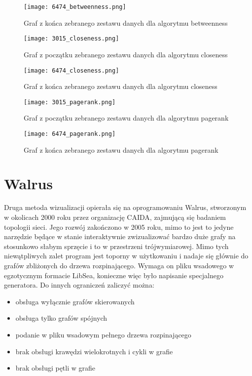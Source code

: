 \FloatBarrier\FloatBarrier
\begin{figure}[h]
	\centering
	\texttt{[image: 6474\_betweenness.png]}
	\caption{Graf z końca zebranego zestawu danych dla algorytmu betweenness}
\end{figure}
\FloatBarrier\FloatBarrier

\FloatBarrier\FloatBarrier
\begin{figure}[h]
	\centering
	\texttt{[image: 3015\_closeness.png]}
	\caption{Graf z początku zebranego zestawu danych dla algorytmu closeness}
\end{figure}
\FloatBarrier\FloatBarrier

\FloatBarrier\FloatBarrier
\begin{figure}[h]
	\centering
	\texttt{[image: 6474\_closeness.png]}
	\caption{Graf z końca zebranego zestawu danych dla algorytmu closeness}
\end{figure}
\FloatBarrier\FloatBarrier

\FloatBarrier\FloatBarrier
\begin{figure}[h]
	\centering
	\texttt{[image: 3015\_pagerank.png]}
	\caption{Graf z początku zebranego zestawu danych dla algorytmu pagerank}
\end{figure}
\FloatBarrier\FloatBarrier

\FloatBarrier\FloatBarrier
\begin{figure}[h]
	\centering
	\texttt{[image: 6474\_pagerank.png]}
	\caption{Graf z końca zebranego zestawu danych dla algorytmu pagerank}
\end{figure}
\FloatBarrier\FloatBarrier

\section{Walrus}

Druga metoda wizualizacji opierała się na oprogramowaniu Walrus, stworzonym w okolicach 2000 roku przez organizację CAIDA, zajmującą się badaniem topologii sieci. Jego rozwój zakończono w 2005 roku, mimo to jest to jedyne narzędzie będące w stanie interaktywnie zwizualizować bardzo duże grafy na stosunkowo słabym sprzęcie i to w przestrzeni trójwymiarowej. Mimo tych niewątpliwych zalet program jest toporny w użytkowaniu i nadaje się głównie do grafów zbliżonych do drzewa rozpinającego. Wymaga on pliku wsadowego w egzotycznym formacie LibSea, konieczne więc było napisanie specjalnego generatora. Do innych ograniczeń zaliczyć można: 
\begin{itemize}
\item obsługa wyłącznie grafów skierowanych
\item obsługa tylko grafów spójnych
\item podanie w pliku wsadowym pełnego drzewa rozpinającego
\item brak obsługi krawędzi wielokrotnych i cykli w grafie
\item brak obsługi pętli w grafie
\end{itemize}

